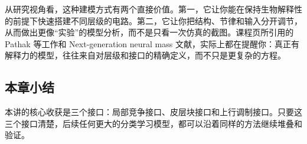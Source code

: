 \documentclass[a4paper]{article}
\begin{document}
从研究视角看，这种建模方式有两个直接价值。第一，它让你能在保持生物解释性的前提下快速搭建不同层级的电路。第二，它让你把结构、节律和输入分开调节，从而做出更像“实验”的模型分析，而不是只看一次仿真的截图。课程页所引用的 Pathak 等工作和 Next-generation neural mass 文献，实际上都在提醒你：真正有解释力的模型，往往来自对层级和接口的精确定义，而不只是更复杂的方程。

\subsection{本章小结}
本讲的核心收获是三个接口：局部竞争接口、皮层块接口和上行调制接口。只要这三个接口清楚，后续任何更大的分类学习模型，都可以沿着同样的方法继续堆叠和验证。
\end{document}
